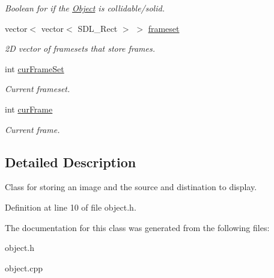 \begin{DoxyCompactItemize}
\begin{DoxyCompactList}\small\item\em Boolean for if the \hyperlink{classObject}{Object} is collidable/solid. \end{DoxyCompactList}\item 
vector$<$ vector$<$ S\+D\+L\+\_\+\+Rect $>$ $>$ \hyperlink{classObject_a6dea9199db9c71cadb54202448a85fc4}{frameset}\hypertarget{classObject_a6dea9199db9c71cadb54202448a85fc4}{}\label{classObject_a6dea9199db9c71cadb54202448a85fc4}

\begin{DoxyCompactList}\small\item\em 2D vector of framesets that store frames. \end{DoxyCompactList}\item 
int \hyperlink{classObject_a2a137e8005d1923f22d90d965b2d11f0}{cur\+Frame\+Set}\hypertarget{classObject_a2a137e8005d1923f22d90d965b2d11f0}{}\label{classObject_a2a137e8005d1923f22d90d965b2d11f0}

\begin{DoxyCompactList}\small\item\em Current frameset. \end{DoxyCompactList}\item 
int \hyperlink{classObject_aac9e198e982b2fb98d94ee66483d2880}{cur\+Frame}\hypertarget{classObject_aac9e198e982b2fb98d94ee66483d2880}{}\label{classObject_aac9e198e982b2fb98d94ee66483d2880}

\begin{DoxyCompactList}\small\item\em Current frame. \end{DoxyCompactList}\end{DoxyCompactItemize}


\subsection{Detailed Description}
Class for storing an image and the source and distination to display. 

Definition at line 10 of file object.\+h.



The documentation for this class was generated from the following files\+:\begin{DoxyCompactItemize}
\item 
object.\+h\item 
object.\+cpp\end{DoxyCompactItemize}
